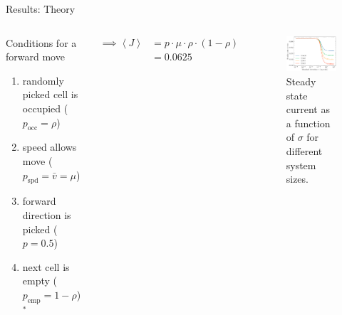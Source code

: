 \documentclass[10pt,xcolor=table, aspectratio=1610]{beamer}
\begin{document}
\begin{frame}{Results: Theory}
  \begin{columns}
    \begin{block}{Conditions for a forward move}
      \begin{enumerate}
        \item randomly picked cell is occupied ($p_\text{occ}=\rho$)
        \item speed allows move ($p_\text{spd}=\bar{v}=\mu$)
        \item forward direction is picked ($p=0.5$)
        \item next cell is empty ($p_\text{emp}=1-\rho$)$^*$
      \end{enumerate}
    \end{block}
    \begin{align*}
      \implies \left\langle J \right\rangle &= p \cdot \mu \cdot \rho \cdot (1-\rho) \\
      &= 0.0625
    \end{align*}
    \begin{figure}
      \includegraphics[width=\textwidth]{../Thesis/img/results/steady_state_current_sizes_log.pdf}
      \caption*{Steady state current as a function of $\sigma$ for different system sizes.}
    \end{figure}
  \end{columns}
\end{frame}
\end{document}
